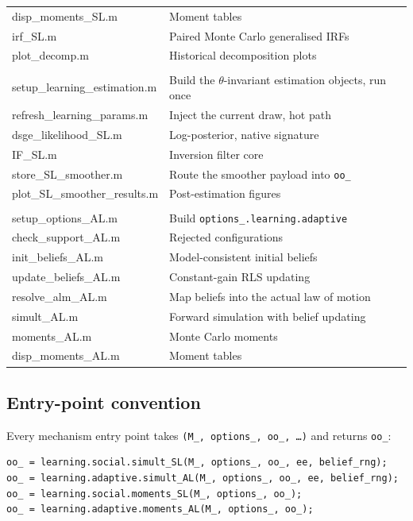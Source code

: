 \documentclass[11pt,a4paper]{article}
\newcommand{\field}[1]{\texttt{#1}}
\begin{document}
\begin{longtable}{>{\ttfamily\small}p{5.5cm} p{8.5cm}}
disp\_moments\_SL.m  & Moment tables \\
irf\_SL.m            & Paired Monte Carlo generalised IRFs \\
plot\_decomp.m       & Historical decomposition plots \\
\midrule
\multicolumn{2}{l}{\normalfont\textit{+learning/+social --- estimation}} \\
\midrule
setup\_learning\_estimation.m & Build the $\theta$-invariant estimation objects, run once \\
refresh\_learning\_params.m   & Inject the current draw, hot path \\
dsge\_likelihood\_SL.m        & Log-posterior, native signature \\
IF\_SL.m                      & Inversion filter core \\
store\_SL\_smoother.m         & Route the smoother payload into \field{oo\_} \\
plot\_SL\_smoother\_results.m & Post-estimation figures \\
\midrule
\multicolumn{2}{l}{\normalfont\textit{+learning/+adaptive}} \\
\midrule
setup\_options\_AL.m  & Build \field{options\_.learning.adaptive} \\
check\_support\_AL.m  & Rejected configurations \\
init\_beliefs\_AL.m   & Model-consistent initial beliefs \\
update\_beliefs\_AL.m & Constant-gain RLS updating \\
resolve\_alm\_AL.m    & Map beliefs into the actual law of motion \\
simult\_AL.m          & Forward simulation with belief updating \\
moments\_AL.m         & Monte Carlo moments \\
disp\_moments\_AL.m   & Moment tables \\
\bottomrule
\end{longtable}


\subsection{Entry-point convention}

Every mechanism entry point takes \texttt{(M\_, options\_, oo\_, \ldots)} and
returns \field{oo\_}:

\begin{lstlisting}[style=matlab]
oo_ = learning.social.simult_SL(M_, options_, oo_, ee, belief_rng);
oo_ = learning.adaptive.simult_AL(M_, options_, oo_, ee, belief_rng);
oo_ = learning.social.moments_SL(M_, options_, oo_);
oo_ = learning.adaptive.moments_AL(M_, options_, oo_);
\end{lstlisting}
\end{document}
